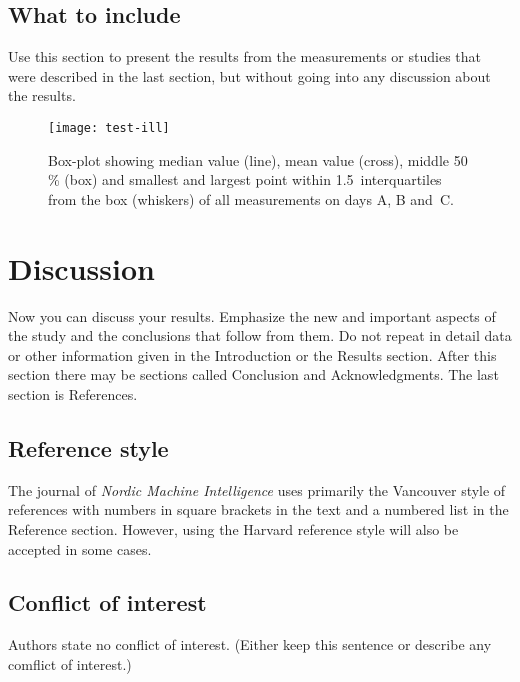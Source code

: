 \documentclass{elbioimp2}
\begin{document}
\subsection{What to include}
Use this section to present the results from the measurements or
studies that were described in the last section, but without going
into any discussion about the results.

\begin{figure}[htp]
  \centering
  \texttt{[image: test-ill]}
  \caption{Box-plot showing median value (line), mean value (cross),
    middle 50\,\% (box) and smallest and largest point within 
    1.5~interquartiles from the box (whiskers) of all measurements
    on days A, B and~C.\label{box-plot}}
\end{figure}

\section{Discussion}
Now you can discuss your results. Emphasize the new and important
aspects of the study and the conclusions that follow from them. Do not
repeat in detail data or other information given in the Introduction
or the Results section. After this section there may be sections
called Conclusion and Acknowledgments. The last section is References.

\subsection{Reference style}
The journal of \emph{Nordic Machine Intelligence} uses primarily the Vancouver
style of references with numbers in square brackets in the text and a
numbered list in the Reference section.\cite{biomed-req} However, using the
Harvard reference style will also be accepted in some cases.

\subsection{Conflict of interest}
Authors state no conflict of interest. (Either keep this sentence or
describe any comflict of interest.)

\newpage
\nocite{*}
\printbibliography
\end{document}
